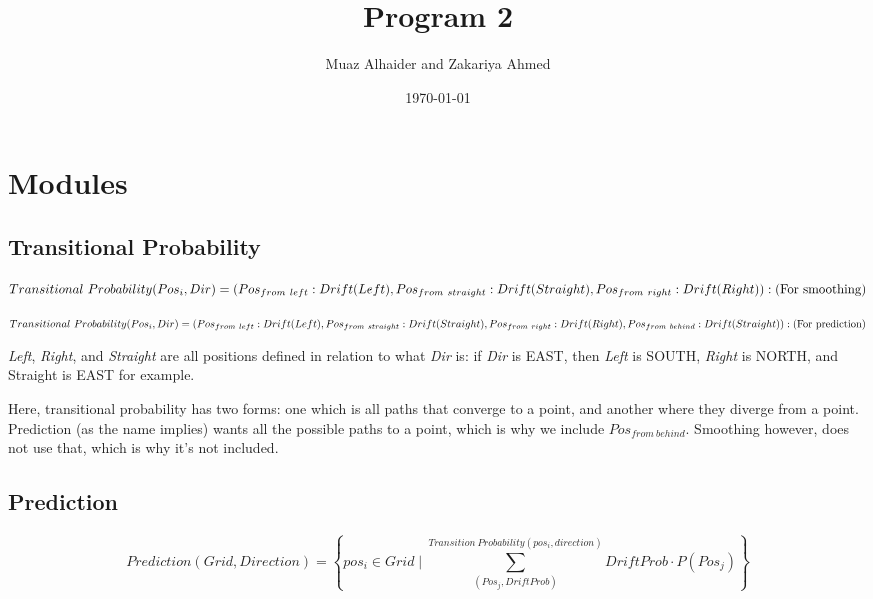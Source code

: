\documentclass[11pt]{article}
\author{Muaz Alhaider and Zakariya Ahmed}
\date{\today}
\title{Program 2}
\begin{document}
\maketitle

\section*{Modules}
\label{sec:orgee52053}

\subsection*{Transitional Probability}
\label{sec:org5525885}
   \begin{math}
    Transitional\ Probability(Pos_i, Dir) = \\
     (Pos_{from\ left}:Drift(Left), Pos_{from\ straight}:Drift(Straight), Pos_{from\ right}:Drift(Right)): (\text{For smoothing})
\end{math}

\newline
\begin{math}
\\ \\
Transitional\ Probability(Pos_i, Dir) =\\ (Pos_{from\ left}:Drift(Left), Pos_{from\ straight}:Drift(Straight), Pos_{from\ right}:Drift(Right), Pos_{from\ behind}:Drift(Straight)): (\text{For prediction})
\\ \\
\end{math}


\emph{Left}, \emph{Right}, and \emph{Straight} are all positions defined in relation to what \emph{Dir} is: if \emph{Dir} is EAST, then \emph{Left} is SOUTH, \emph{Right} is NORTH, and Straight is EAST for example.

Here, transitional probability has two forms: one which is all paths that converge to a point, and another where they diverge from a point. Prediction (as the name implies) wants all the possible paths to a point, which is why we include \(Pos_{from\ behind}\). Smoothing however, does not use that, which is why it's not included.


\subsection*{Prediction}
\label{sec:org18b630d}
$$Prediction(Grid, Direction) = \left\{pos_i \in Grid \mid \sum_{(Pos_j, DriftProb)}^{Transition\ Probability(pos_i, direction)} DriftProb \cdot P(Pos_j) \right \}$$
\end{document}
